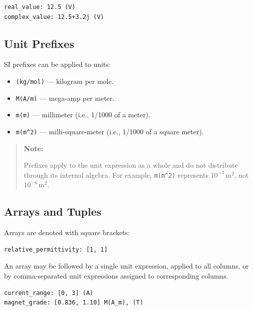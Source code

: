\documentclass[11pt]{article}
\begin{document}
\begin{lstlisting}[language=UnitValuesUIV]
real_value: 12.5 (V)
complex_value: 12.5+3.2j (V)
\end{lstlisting}


\subsection{Unit Prefixes}

SI prefixes can be applied to units:

\begin{itemize}
  \item \texttt{(kg/mol)} --- kilogram per mole.
  \item \texttt{M(A/m)} --- mega-amp per meter.
  \item \texttt{m(m)} --- millimeter (i.e., 1/1000 of a meter).
  \item \texttt{m(m\string^2)} --- milli-square-meter
        (i.e., 1/1000 of a square meter).
\end{itemize}

\begin{quote}
  \textbf{Note:} 
  
  Prefixes apply to the unit expression as a whole and do not
  distribute through its internal algebra. For example,
  \texttt{m(m\string^2)} represents $10^{-3}\,\mathrm{m^2}$, not
  $10^{-6}\,\mathrm{m^2}$.
\end{quote}

\newpage


\subsection{Arrays and Tuples}

Arrays are denoted with square brackets:

\begin{lstlisting}[language=UnitValuesUIV]
relative_permittivity: [1, 1]
\end{lstlisting}

An array may be followed by a single unit expression, 
applied to all columns, or by comma-separated unit expressions 
assigned to corresponding columns. 

\begin{lstlisting}[language=UnitValuesUIV]
current_range: [0, 3] (A)
magnet_grade: [0.836, 1.10] M(A_m), (T)
\end{lstlisting}
\end{document}
